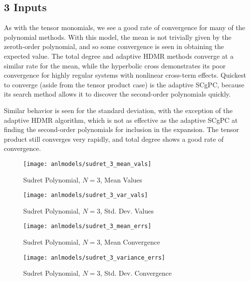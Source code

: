 \subsection{3 Inputs}
As with the tensor monomials, we see a good rate of convergence for many of the polynomial methods.  With
this model, the mean is not trivially given by the zeroth-order polynomial, and so some convergence is seen
in obtaining the expected value.  The total degree and adaptive HDMR methods converge at a similar rate for
the mean, while the hyperbolic cross demonstrates its poor convergence for highly regular systems with
nonlinear cross-term effects.  Quickest to converge (aside from the tensor product case) is the adaptive
SCgPC, because its search method allows it to discover the second-order polynomials quickly.

Similar behavior is seen for the standard deviation, with the exception of the adaptive HDMR algorithm, which
is not as effective as the adaptive SCgPC at finding the second-order polynomials for inclusion in the expansion.
The tensor product still converges very rapidly, and total degree shows a good rate of convergence.
\begin{figure}[H]
  \centering
  \texttt{[image: anlmodels/sudret\_3\_mean\_vals]}
  \caption{Sudret Polynomial, $N=3$, Mean Values}
  \label{fig:sudretpoly mean values 3}
\end{figure}
\begin{figure}[H]
  \centering
  \texttt{[image: anlmodels/sudret\_3\_var\_vals]}
  \caption{Sudret Polynomial, $N=3$, Std. Dev. Values}
  \label{fig:sudretpoly var values 3}
\end{figure}

\begin{figure}[H]
  \centering
  \texttt{[image: anlmodels/sudret\_3\_mean\_errs]}
  \caption{Sudret Polynomial, $N=3$, Mean Convergence}
  \label{fig:sudretpoly mean errors 3}
\end{figure}
\begin{figure}[H]
  \centering
  \texttt{[image: anlmodels/sudret\_3\_variance\_errs]}
  \caption{Sudret Polynomial, $N=3$, Std. Dev. Convergence}
  \label{fig:sudretpoly var errors 3}
\end{figure}


